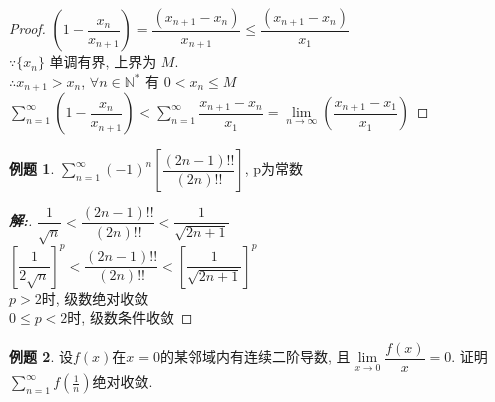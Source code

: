 \documentclass[12pt,a4paper]{ctexart}
\newenvironment{solution}{\begin{proof}[\hspace{2em}\textbf{解:}]}{\end{proof}}
\theoremstyle{definition}%
\newtheorem{exercise}{\hspace{2em}例题}
\begin{document}
\begin{proof}
	$ (1-\dfrac{x_n}{x_{n+1}})
	=\dfrac{(x_{n+1}-x_n)}{x_{n+1}}
	\le\dfrac{(x_{n+1}-x_n)}{x_1} $\\
	
	$ \because\{x_n\} $ 单调有界, 上界为 $ M $.\\
	
	$ \therefore x_{n+1}>x_n $, $\forall n \in \mathbb{N}^*$ 有 $ 0 < x_n \le M $\\
	
	$\displaystyle\sum_{n=1}^{\infty}\left( 1-\dfrac{x_n}{x_{n+1}} \right)
	< \sum_{n=1}^{\infty}\dfrac{x_{n+1}-x_n}{x_1}
	= \lim\limits_{n \to \infty}\left( \dfrac{x_{n+1}-x_1}{x_1} \right) $
\end{proof}

\begin{exercise}
	$\displaystyle\sum_{n=1}^{\infty}(-1)^n [\dfrac{(2n-1)!!}{(2n)!!}]$, p为常数
\end{exercise}
\begin{solution}
	$ \dfrac{1}{\sqrt{n}}<\dfrac{(2n-1)!!}{(2n)!!}<\dfrac{1}{\sqrt{2n+1}} $\\
	
	$ [\dfrac{1}{2\sqrt{n}}]^p<\dfrac{(2n-1)!!}{(2n)!!}<[\dfrac{1}{\sqrt{2n+1}}]^p $\\
	
	$ p>2 $时, 级数绝对收敛\\
	$ 0 \le p<2 $时, 级数条件收敛
\end{solution}

\begin{exercise}
	设$f(x)$在$x=0$的某邻域内有连续二阶导数, 且$\lim\limits_{x \to 0}\dfrac{f(x)}{x}=0$. 证明$\displaystyle\sum_{n=1}^{\infty}f(\frac{1}{n})$绝对收敛.
\end{exercise}
\end{document}
